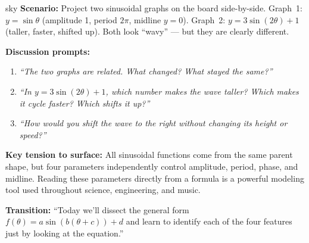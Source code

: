 \documentclass[10pt]{article}
\begin{document}
\begin{skillbox}{sky}
\textbf{Scenario:} Project two sinusoidal graphs on the board side-by-side.
Graph~1: $y=\sin\theta$ (amplitude 1, period $2\pi$, midline $y=0$).
Graph~2: $y=3\sin(2\theta)+1$ (taller, faster, shifted up).
Both look ``wavy'' --- but they are clearly different.

\textbf{Discussion prompts:}
\begin{enumerate}[leftmargin=1.4em, itemsep=3pt]
  \item \textit{``The two graphs are related. What changed? What stayed the same?''}
  \item \textit{``In $y = 3\sin(2\theta)+1$, which number makes the wave
    taller? Which makes it cycle faster? Which shifts it up?''}
  \item \textit{``How would you shift the wave to the \emph{right} without
    changing its height or speed?''}
\end{enumerate}

\textbf{Key tension to surface:} All sinusoidal functions come from the same
parent shape, but four parameters independently control amplitude, period,
phase, and midline. Reading these parameters directly from a formula is a
powerful modeling tool used throughout science, engineering, and music.

\textbf{Transition:} ``Today we'll dissect the general form
$f(\theta)=a\sin(b(\theta+c))+d$ and learn to identify each of the four
features just by looking at the equation.''
\end{skillbox}

\vspace{0.08in}
\end{document}
